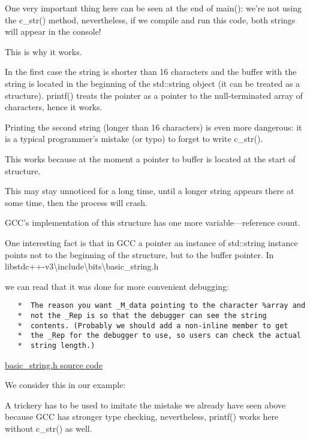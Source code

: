 One very important thing here can be seen at the end of main(): we're not using the c\_str() method, nevertheless,
if we compile and run this code, both strings will appear in the console!

This is why it works.

In the first case the string is shorter than 16 characters and the buffer with the string is located in the
beginning of the std::string object (it can be treated as a structure).
printf() treats the pointer as a pointer to the null-terminated 
array of characters, hence it works.

Printing the second string (longer than 16 characters) is even more dangerous: it is a typical programmer's mistake
(or typo) to forget to write c\_str().

This works because at the moment a pointer to buffer is located at the start of structure.

This may stay unnoticed for a long time, until a longer string appears there at some time, 
then the process will crash.


GCC's implementation of this structure has one more variable---reference count.

One interesting fact is that in GCC a pointer an instance of std::string instance points not to
the beginning of the structure, but to the buffer pointer.
In libstdc++-v3\textbackslash{}include\textbackslash{}bits\textbackslash{}basic\_string.h 

we can read that it was done for more convenient debugging:

\begin{lstlisting}
   *  The reason you want _M_data pointing to the character %array and
   *  not the _Rep is so that the debugger can see the string
   *  contents. (Probably we should add a non-inline member to get
   *  the _Rep for the debugger to use, so users can check the actual
   *  string length.)
\end{lstlisting}

\href{http://go.yurichev.com/17085}{basic\_string.h source code}

We consider this in our example:



A trickery has to be used to imitate the mistake we already have seen above because GCC
has stronger type checking, nevertheless, printf() works here without c\_str() as well.

